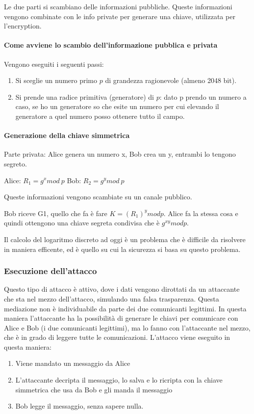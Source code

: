 Le due parti si scambiano delle informazioni pubbliche. Queste informazioni 
vengono combinate con le info private per generare una chiave, utilizzata per 
l'encryption.

\paragraph*{Come avviene lo scambio dell'informazione pubblica e privata}

Vengono eseguiti i seguenti passi:

\begin{enumerate}
 \item Si sceglie un numero primo $p$ di grandezza ragionevole (almeno 2048 
 bit).
 \item Si prende una radice primitiva (generatore) di $p$: dato p prendo un 
 numero a caso, se ho un generatore so che esite un numero per cui elevando il 
 generatore a quel numero posso ottenere tutto il campo.
\end{enumerate}

\paragraph*{Generazione della chiave simmetrica}

Parte privata: Alice genera un numero x, Bob crea un y, entrambi lo tengono 
segreto.

Alice: $R_1 = g^x mod\ p$
Bob: $R_2 = g^y mod\ p$

Queste informazioni vengono scambiate su un canale pubblico.

Bob riceve G1, quello che fa è fare $K = (R_1)^y mod p$. Alice fa la stessa 
cosa e quindi ottengono una chiave segreta condivisa che è $g^{xy} mod p$.

Il calcolo del logaritmo discreto ad oggi è un problema che è difficile da 
risolvere in maniera efficente, ed è quello su cui la sicurezza si basa su 
questo problema.

\subsubsection{Esecuzione dell'attacco}

Questo tipo di attacco è attivo, dove i dati vengono dirottati da un attaccante 
che sta nel mezzo dell'attacco, simulando una falsa trasparenza. Questa 
mediazione non è individuabile da parte dei due comunicanti legittimi. In 
questa maniera l'attaccante ha la possibilità di generare le chiavi per 
comunicare con Alice e Bob (i due comunicanti legittimi), ma lo fanno con 
l'attaccante nel mezzo, che è in grado di leggere tutte le comunicazioni.
L'attacco viene eseguito in questa maniera:
\begin{enumerate}
\item Viene mandato un messaggio da Alice
\item L'attaccante decripta il messaggio, lo salva e lo ricripta con la chiave 
simmetrica che usa da Bob e gli manda il messaggio
\item Bob legge il messaggio, senza sapere nulla.
\end{enumerate}



